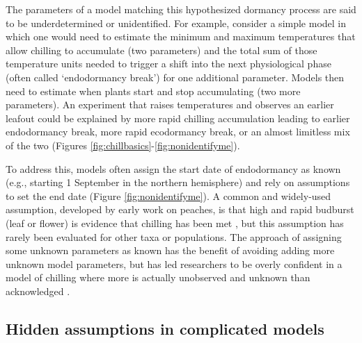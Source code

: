 \documentclass[11pt]{article}
\providecommand{\DIFadd}[1]{{\protect\color{blue}\uwave{#1}}} %
\providecommand{\DIFaddbegin}{} %
\providecommand{\DIFaddend}{} %
\newcommand{\DIFaddincludegraphics}[2][]{{\color{blue}\fbox{\DIFOincludegraphics[#1]{#2}}}} %
\DeclareRobustCommand{\DIFaddbegin}{\DIFOaddbegin \let\includegraphics\DIFaddincludegraphics} %
\DeclareRobustCommand{\DIFaddend}{\DIFOaddend \let\includegraphics\DIFOincludegraphics} %
\begin{document}
The parameters of a model matching this hypothesized dormancy process are said to be underdetermined or unidentified. For example, consider a simple model in which one would need to estimate the minimum and maximum temperatures that allow chilling to accumulate (two parameters) and the total sum of those temperature units needed to trigger a shift into the next physiological phase (often called `endodormancy break') for one additional parameter. Models then need to estimate when plants start and stop accumulating (two more parameters). An experiment that raises temperatures and observes an earlier leafout could be explained by more rapid chilling accumulation leading to earlier endodormancy break, more rapid ecodormancy break, or an almost limitless mix of the two (Figures \ref{fig:chillbasics}-\ref{fig:nonidentifyme}). %

To address this, models often assign the start date of endodormancy as known (e.g., starting 1 September in the northern hemisphere) and rely on assumptions to set the end date (Figure \ref{fig:nonidentifyme}). A common and widely-used assumption, developed by early work on peaches, is that high and rapid budburst (leaf or flower) is evidence that chilling has been met \citep[i.e. endodormancy has ended,][see also Figure \ref{fig:chillbasics}]{erez1971}, but this assumption has rarely been evaluated for other taxa or populations. The approach of assigning some unknown parameters as known has the benefit of avoiding adding more unknown model parameters, but has led researchers to be overly confident in a model of chilling where more is actually unobserved and unknown than acknowledged \DIFaddbegin \DIFadd{(Figure \ref{fig:nonidentifyme})}\DIFaddend . 

\subsection*{Hidden assumptions in complicated models}
\end{document}

